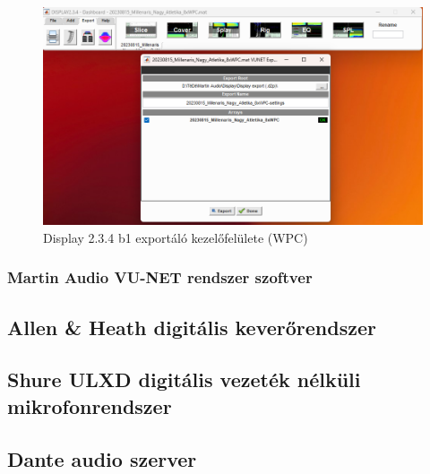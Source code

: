 \begin{figure}[H]
	\centering
	\includegraphics[width=\textwidth, keepaspectratio]{figures/display_wpc_7.png}
	\caption{Display 2.3.4 b1 exportáló kezelőfelülete (WPC)}\label{fig:display_wpc_7}
\end{figure}
\subsubsection{Martin Audio VU-NET rendszer szoftver \cite{VUNETUSERGUIDE}}


\subsection{Allen \& Heath digitális keverőrendszer}



\subsection{Shure ULXD digitális vezeték nélküli mikrofonrendszer}



\subsection{Dante audio szerver}



